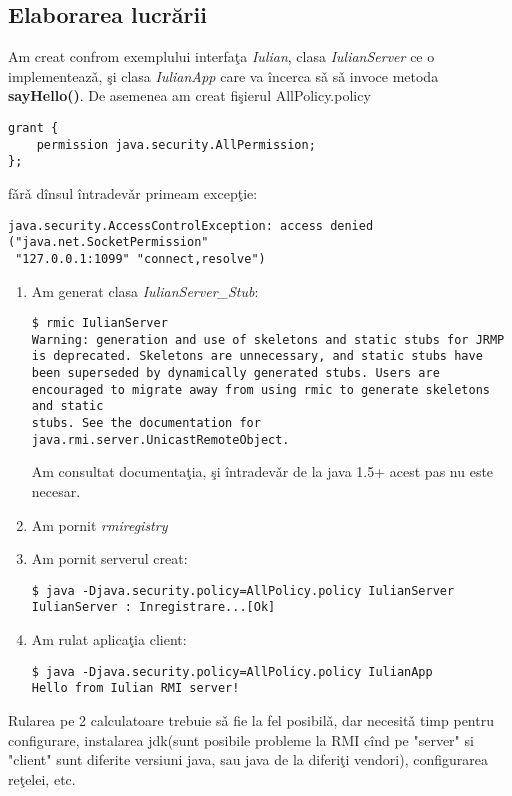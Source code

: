 \subsection{Elaborarea lucr\u{a}rii}
Am creat confrom exemplului interfa\c{t}a \emph{Iulian}, clasa \emph{IulianServer} ce
o implementeaz\v{a}, \c{s}i clasa \emph{IulianApp} care va \^{i}ncerca s\v{a} s\v{a} invoce
metoda \textbf{sayHello()}. De asemenea am creat fi\c{s}ierul AllPolicy.policy
\begin{verbatim}
grant {
    permission java.security.AllPermission;
};
\end{verbatim}
f\v{a}r\v{a} d\^{i}nsul \^{i}ntradev\v{a}r primeam excep\c{t}ie:
\begin{verbatim}
java.security.AccessControlException: access denied ("java.net.SocketPermission"
 "127.0.0.1:1099" "connect,resolve")
\end{verbatim}
\begin{enumerate}
    \item{Am generat clasa \emph{IulianServer\_Stub}:
\begin{verbatim}
$ rmic IulianServer
Warning: generation and use of skeletons and static stubs for JRMP
is deprecated. Skeletons are unnecessary, and static stubs have
been superseded by dynamically generated stubs. Users are
encouraged to migrate away from using rmic to generate skeletons and static
stubs. See the documentation for java.rmi.server.UnicastRemoteObject.
\end{verbatim}
    Am consultat documenta\c{t}ia, \c{s}i \^{i}ntradev\v{a}r de la java 1.5+ acest pas nu este necesar.}
    \item{Am pornit \emph{rmiregistry}}
    \item{Am pornit serverul creat:
\begin{verbatim}
$ java -Djava.security.policy=AllPolicy.policy IulianServer
IulianServer : Inregistrare...[Ok]
\end{verbatim}}
    \item{Am rulat aplica\c{t}ia client:
\begin{verbatim}
$ java -Djava.security.policy=AllPolicy.policy IulianApp
Hello from Iulian RMI server!
\end{verbatim}}
\end{enumerate}

Rularea pe 2 calculatoare trebuie s\v{a} fie la fel posibil\v{a}, dar necesit\v{a} timp pentru configurare, instalarea jdk(sunt posibile probleme la RMI c\^{i}nd pe "server" si "client" sunt diferite versiuni java, sau java de la diferi\c{t}i vendori), configurarea re\c{t}elei, etc.

